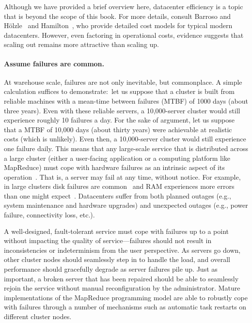 Although we have provided a brief overview here, datacenter efficiency
is a topic that is beyond the scope of this book.  For more details,
consult Barroso and H\"{o}lzle~\cite{Barroso_Holzle_2009} and
Hamilton~\cite{Hamilton_2009}, who provide detailed cost models for
typical modern datacenters.  However, even factoring in operational
costs, evidence suggests that scaling out remains more attractive than
scaling up.


\paragraph{Assume failures are common.} 
At warehouse scale, failures are not only inevitable, but commonplace.
A simple calculation suffices to demonstrate:\ let us suppose that a
cluster is built from reliable machines with a mean-time between
failures (MTBF) of 1000 days (about three years).  Even with these
reliable servers, a 10,000-server cluster would still experience
roughly 10 failures a day.  For the sake of argument, let us suppose
that a MTBF of 10,000 days (about thirty years) were achievable at
realistic costs (which is unlikely).  Even then, a 10,000-server
cluster would still experience one failure daily.  This means that any
large-scale service that is distributed across a large cluster (either
a user-facing application or a computing platform like MapReduce) must
cope with hardware failures as an intrinsic aspect of its
operation~\cite{Hamilton_2007}.  That is, a server may fail at any
time, without notice.  For example, in large clusters disk failures
are common~\cite{Pinheiro_etal_2007} and RAM experiences more errors
than one might expect~\cite{Schroeder_etal_2009}.  Datacenters suffer
from both planned outages (e.g., system maintenance and hardware
upgrades) and unexpected outages (e.g., power failure, connectivity
loss, etc.).

A well-designed, fault-tolerant service must cope with failures up to
a point without impacting the quality of service---failures should not
result in inconsistencies or indeterminism from the user perspective.
As servers go down, other cluster nodes should seamlessly step in to
handle the load, and overall performance should gracefully degrade as
server failures pile up.  Just as important, a broken server that has
been repaired should be able to seamlessly rejoin the service without
manual reconfiguration by the administrator.  Mature implementations of
the MapReduce programming model are able to robustly cope with
failures through a number of mechanisms such as automatic task
restarts on different cluster nodes.

